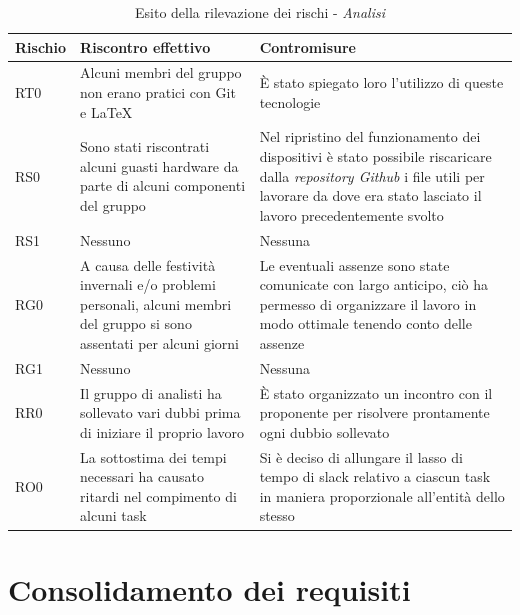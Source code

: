 \documentclass[./PianodiProgetto.tex]{subfiles}
\begin{document}
\setlength\LTleft{-5.5mm}

\begin{longtable}{|p{15mm}|p{60mm}|p{60mm}|}
	\caption{Esito della rilevazione dei rischi - \textit{Analisi}} \\
	\hline \textbf{Rischio} & \textbf{Riscontro effettivo} & \textbf{Contromisure} \\
	
	\hline RT0 & Alcuni membri del gruppo non erano pratici con Git e \LaTeX &  È stato spiegato loro l'utilizzo di queste tecnologie \\
	
	\hline RS0 & Sono stati riscontrati alcuni guasti hardware da parte di alcuni componenti del gruppo & Nel ripristino del funzionamento dei dispositivi è stato possibile riscaricare dalla \textit{repository Github} i file utili per lavorare da dove era stato lasciato il lavoro precedentemente svolto \\
	
	\hline RS1 & Nessuno & Nessuna \\
	
	\hline RG0 & A causa delle festività invernali e/o problemi personali, alcuni membri del gruppo si sono assentati per alcuni giorni & Le eventuali assenze sono state comunicate con largo anticipo, ciò ha permesso di organizzare il lavoro in modo ottimale tenendo conto delle assenze \\
	
	\hline RG1 & Nessuno & Nessuna \\
	
	\hline RR0 & Il gruppo di analisti ha sollevato vari dubbi prima di iniziare il proprio lavoro & È stato organizzato un incontro con il proponente per risolvere prontamente ogni dubbio sollevato \\
	
	\hline RO0 & La sottostima dei tempi necessari ha causato ritardi nel compimento di alcuni task & Si è deciso di allungare il lasso di tempo di slack relativo a ciascun task in maniera proporzionale all'entità dello stesso \\
	
	\hline
\end{longtable}

\section{Consolidamento dei requisiti}

\setlength\LTleft{-5.5mm}
\end{document}
